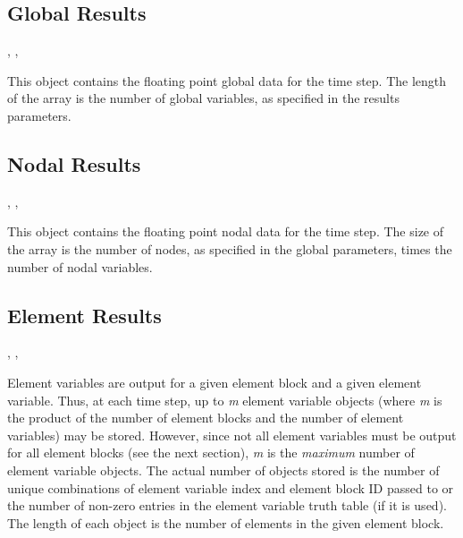 \subsection{Global Results}

\begin{spacing}{1.5}
\api {}, , 
\end{spacing}

This object contains the floating point global data for the time
step. The length of the array is the number of global variables, as
specified in the results parameters.


\subsection{Nodal Results}

\begin{spacing}{1.5}
\api {}, , 
\end{spacing}

This object contains the floating point nodal data for the
time step. The size of the array is the number of nodes, as specified
in the global parameters, times the number of nodal variables.

\subsection{Element Results}

\begin{spacing}{1.5}
\api {}, , 
\end{spacing}

Element variables are output for a given element block and a given
element variable. Thus, at each time step, up to \textit{{m}} element
variable objects (where \textit{{m}} is the product of the number of
element blocks and the number of element variables) may be
stored. However, since not all element variables must be output for
all element blocks (see the next section), \textit{{m}} is the
\textit{{maximum}} number of element variable objects. The actual
number of objects stored is the number of unique combinations of
element variable index and element block ID passed to
 or the number of non-zero entries in the
element variable truth table (if it is used). The length of each
object is the number of elements in the given element block.


